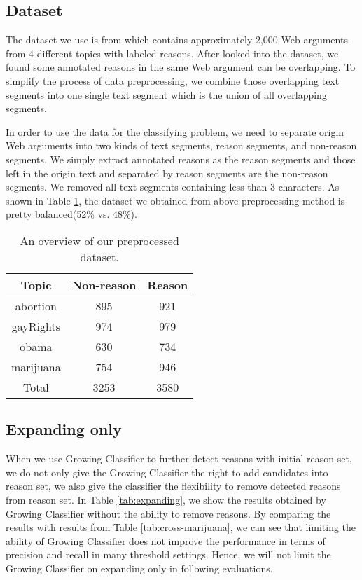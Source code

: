 \documentclass[11pt,a4paper]{article}
\begin{document}
\subsection{Dataset}

The dataset we use is from\cite{hasan2014you} which contains approximately 2,000 Web arguments from 4 different topics with labeled reasons. After looked into the dataset, we found some annotated reasons in the same Web argument can be overlapping. To simplify the process of data preprocessing, we combine those overlapping text segments into one single text segment which is the union of all overlapping segments. 

In order to use the data for the classifying problem, we need to separate origin Web arguments into two kinds of text segments, reason segments, and non-reason segments. We simply extract annotated reasons as the reason segments and those left in the origin text and separated by reason segments are the non-reason segments. We removed all text segments containing less than 3 characters. As shown in Table \ref{tab:dataset}, the dataset we obtained from above preprocessing method is pretty balanced(52\% vs. 48\%).

\begin{table}[h]
\begin{center}
\begin{tabular}{|c||c|c|}
\hline \bf Topic & \bf Non-reason & \bf Reason\\ \hline\hline
abortion  & 895  & 921  \\
gayRights & 974  & 979  \\
obama     & 630  & 734  \\
marijuana & 754  & 946  \\
Total     & 3253 & 3580 \\ 
\hline
\end{tabular}
\end{center}
\caption{\label{tab:dataset} An overview of our preprocessed dataset.}
\end{table}

\subsection{Expanding only}

When we use Growing Classifier to further detect reasons with initial reason set, we do not only give the Growing Classifier the right to add candidates into reason set, we also give the classifier the flexibility to remove detected reasons from reason set. In Table \ref{tab:expanding}, we show the results obtained by Growing Classifier without the ability to remove reasons. By comparing the results with results from Table \ref{tab:cross-marijuana}, we can see that limiting the ability of Growing Classifier does not improve the performance in terms of precision and recall in many threshold settings. Hence, we will not limit the Growing Classifier on expanding only in following evaluations. 
\end{document}
